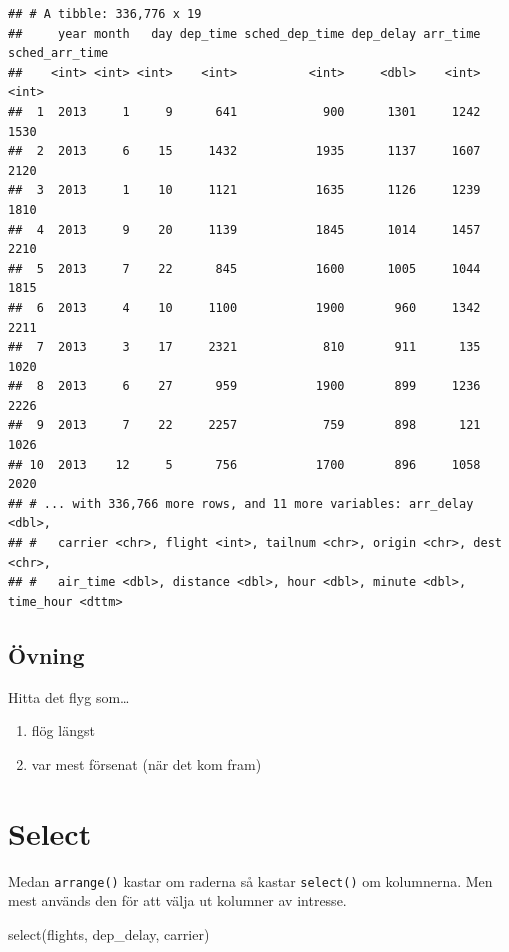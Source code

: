 \documentclass[
]{book}
\newenvironment{Shaded}{\begin{snugshade}}{\end{snugshade}}
\newcommand{\FunctionTok}[1]{\textcolor[rgb]{0.00,0.00,0.00}{#1}}
\newcommand{\NormalTok}[1]{#1}
\providecommand{\tightlist}{%
  \setlength{\itemsep}{0pt}\setlength{\parskip}{0pt}}
\begin{document}
\begin{verbatim}
## # A tibble: 336,776 x 19
##     year month   day dep_time sched_dep_time dep_delay arr_time sched_arr_time
##    <int> <int> <int>    <int>          <int>     <dbl>    <int>          <int>
##  1  2013     1     9      641            900      1301     1242           1530
##  2  2013     6    15     1432           1935      1137     1607           2120
##  3  2013     1    10     1121           1635      1126     1239           1810
##  4  2013     9    20     1139           1845      1014     1457           2210
##  5  2013     7    22      845           1600      1005     1044           1815
##  6  2013     4    10     1100           1900       960     1342           2211
##  7  2013     3    17     2321            810       911      135           1020
##  8  2013     6    27      959           1900       899     1236           2226
##  9  2013     7    22     2257            759       898      121           1026
## 10  2013    12     5      756           1700       896     1058           2020
## # ... with 336,766 more rows, and 11 more variables: arr_delay <dbl>,
## #   carrier <chr>, flight <int>, tailnum <chr>, origin <chr>, dest <chr>,
## #   air_time <dbl>, distance <dbl>, hour <dbl>, minute <dbl>, time_hour <dttm>
\end{verbatim}

\hypertarget{uxf6vning-1}{%
\subsection{Övning}\label{uxf6vning-1}}

Hitta det flyg som\ldots{}

\begin{enumerate}
\def\labelenumi{\arabic{enumi}.}
\tightlist
\item
  flög längst
\item
  var mest försenat (när det kom fram)
\end{enumerate}

\hypertarget{select}{%
\section{Select}\label{select}}

Medan \texttt{arrange()} kastar om raderna så kastar \texttt{select()} om kolumnerna. Men mest används den för att välja ut kolumner av intresse.

\begin{Shaded}
\begin{Highlighting}[]
\FunctionTok{select}\NormalTok{(flights, dep\_delay, carrier)}
\end{Highlighting}
\end{Shaded}
\end{document}
